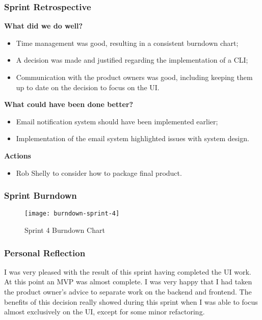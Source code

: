     \subsubsection{Sprint Retrospective}
    \textbf{What did we do well?}
    \begin{itemize}
      \item Time management was good, resulting in a consistent burndown chart;
      \item A decision was made and justified regarding the implementation of a CLI;
      \item Communication with the product owners was good, including keeping them up to date on the decision to focus on the UI.
    \end{itemize}
    
    \noindent\textbf{What could have been done better?}
    \begin{itemize}
      \item Email notification system should have been implemented earlier;
      \item Implementation of the email system highlighted issues with system design.
    \end{itemize}
    
    \noindent\textbf{Actions}
    \begin{itemize}
      \item Rob Shelly to consider how to package final product.
    \end{itemize}
    
    \subsubsection{Sprint Burndown}
    
    \begin{figure}[H]
      \setlength{\belowcaptionskip}{15pt plus 3pt minus 2pt}
      \caption{Sprint 4 Burndown Chart}
      \centering
      \texttt{[image: burndown-sprint-4]}
      \label{fig:burndown-sprint-4}
    \end{figure}
    
    \subsubsection{Personal Reflection}
    I was very pleased with the result of this sprint having completed the UI work. At this point an MVP was almost complete. I was very happy that I had taken the product owner's advice to separate work on the backend and frontend. The benefits of this decision really showed during this sprint when I was able to focus almost exclusively on the UI, except for some minor refactoring.
    
